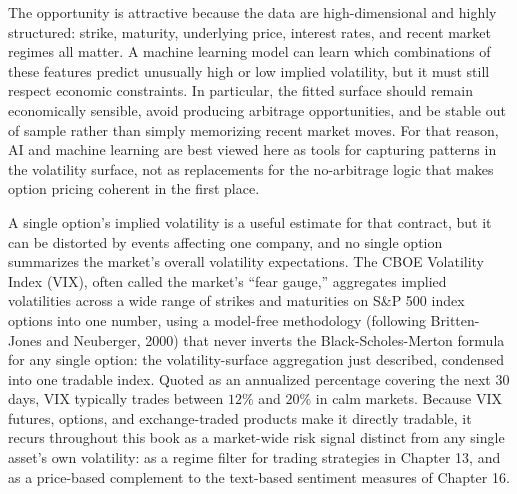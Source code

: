 \documentclass[../ai_in_finance]{subfiles}
\begin{document}
The opportunity is attractive because the data are high-dimensional and highly structured: strike, maturity, underlying price, interest rates, and recent market regimes all matter. A machine learning model can learn which combinations of these features predict unusually high or low implied volatility, but it must still respect economic constraints. In particular, the fitted surface should remain economically sensible, avoid producing arbitrage opportunities, and be stable out of sample rather than simply memorizing recent market moves. For that reason, AI and machine learning are best viewed here as tools for capturing patterns in the volatility surface, not as replacements for the no-arbitrage logic that makes option pricing coherent in the first place.

A single option's implied volatility is a useful estimate for that contract, but it can be distorted by events affecting one company, and no single option
summarizes the market's overall volatility expectations. The CBOE Volatility Index (VIX), often called the market's
``fear gauge,'' aggregates implied volatilities across a wide range of strikes and maturities on S\&P 500 index options into one number, using a model-free
methodology (following Britten-Jones and Neuberger, 2000) that never inverts the Black-Scholes-Merton formula for any single option: the volatility-surface
aggregation just described, condensed into one tradable index. Quoted as an annualized percentage covering the next 30 days, VIX typically trades between
$12\%$ and $20\%$ in calm markets. Because VIX futures, options, and exchange-traded products make it directly tradable, it recurs throughout this book as a
market-wide risk signal distinct from any single asset's own volatility: as a regime filter for trading strategies in Chapter 13, and as a price-based
complement to the text-based sentiment measures of Chapter 16.
\end{document}
